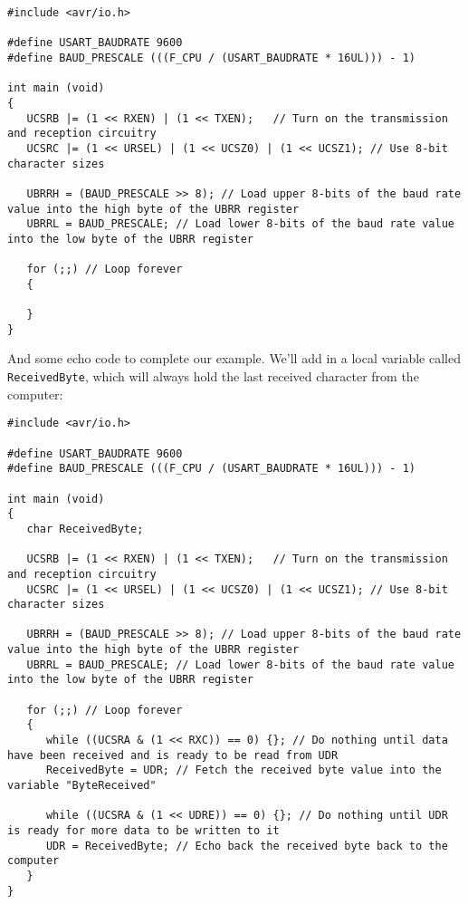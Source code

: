 \documentclass[a4paper,oneside,notitlepage]{book}
\begin{document}
\begin{center}
\begin{lstlisting}
#include <avr/io.h>

#define USART_BAUDRATE 9600
#define BAUD_PRESCALE (((F_CPU / (USART_BAUDRATE * 16UL))) - 1)

int main (void)
{
   UCSRB |= (1 << RXEN) | (1 << TXEN);   // Turn on the transmission and reception circuitry
   UCSRC |= (1 << URSEL) | (1 << UCSZ0) | (1 << UCSZ1); // Use 8-bit character sizes

   UBRRH = (BAUD_PRESCALE >> 8); // Load upper 8-bits of the baud rate value into the high byte of the UBRR register
   UBRRL = BAUD_PRESCALE; // Load lower 8-bits of the baud rate value into the low byte of the UBRR register

   for (;;) // Loop forever
   {

   }
}
\end{lstlisting}
\end{center}

And some echo code to complete our example. We'll add in a local variable called \texttt{ReceivedByte}, which will always hold the last received character from the computer:

\begin{center}
\begin{lstlisting}
#include <avr/io.h>

#define USART_BAUDRATE 9600
#define BAUD_PRESCALE (((F_CPU / (USART_BAUDRATE * 16UL))) - 1)

int main (void)
{
   char ReceivedByte;

   UCSRB |= (1 << RXEN) | (1 << TXEN);   // Turn on the transmission and reception circuitry
   UCSRC |= (1 << URSEL) | (1 << UCSZ0) | (1 << UCSZ1); // Use 8-bit character sizes

   UBRRH = (BAUD_PRESCALE >> 8); // Load upper 8-bits of the baud rate value into the high byte of the UBRR register
   UBRRL = BAUD_PRESCALE; // Load lower 8-bits of the baud rate value into the low byte of the UBRR register

   for (;;) // Loop forever
   {
      while ((UCSRA & (1 << RXC)) == 0) {}; // Do nothing until data have been received and is ready to be read from UDR
      ReceivedByte = UDR; // Fetch the received byte value into the variable "ByteReceived"

      while ((UCSRA & (1 << UDRE)) == 0) {}; // Do nothing until UDR is ready for more data to be written to it
      UDR = ReceivedByte; // Echo back the received byte back to the computer
   }   
}
\end{lstlisting}
\end{center}
\end{document}
